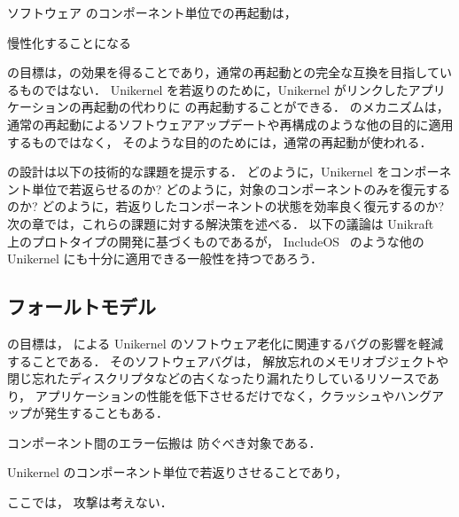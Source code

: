 ソフトウェア
\sysname のコンポーネント単位での再起動は，


慢性化することになる




\sysname の目標は，\rr の効果を得ることであり，通常の再起動との完全な互換を目指しているものではない．
Unikernel を若返りのために，Unikernel がリンクしたアプリケーションの再起動の代わりに \sysname の再起動することができる．
\sysname のメカニズムは，
通常の再起動によるソフトウェアアップデートや再構成のような他の目的に適用するものではなく，
そのような目的のためには，通常の再起動が使われる．

\sysname の設計は以下の技術的な課題を提示する．
どのように，Unikernel をコンポーネント単位で若返らせるのか?
どのように，対象のコンポーネントのみを復元するのか?
どのように，若返りしたコンポーネントの状態を効率良く復元するのか?
次の章では，これらの課題に対する解決策を述べる．
以下の議論は Unikraft~\cite{KuenzerEtAl-Unikraft} 上のプロトタイプの開発に基づくものであるが，
IncludeOS~\cite{BratterudEtAl-IncludeOS} のような他の Unikernel にも十分に適用できる一般性を持つであろう．


\subsection{フォールトモデル}

\sysname の目標は，
\rr による Unikernel のソフトウェア老化に関連するバグの影響を軽減することである．
そのソフトウェアバグは，
解放忘れのメモリオブジェクトや閉じ忘れたディスクリプタなどの古くなったり漏れたりしているリソースであり，
アプリケーションの性能を低下させるだけでなく，クラッシュやハングアップが発生することもある．

コンポーネント間のエラー伝搬は
防ぐべき対象である．

Unikernel のコンポーネント単位で若返りさせることであり，

ここでは，
攻撃は考えない．
